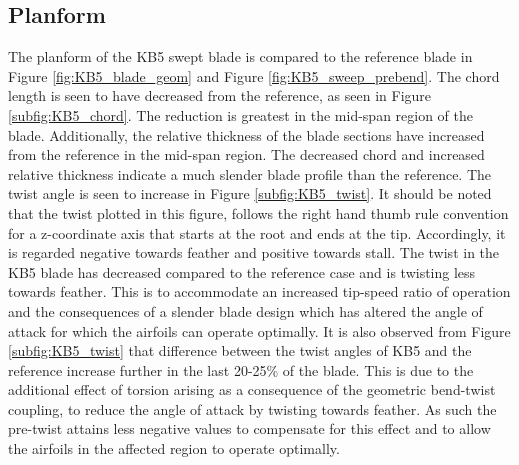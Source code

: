 
\subsection{Planform}
The planform of the KB5 swept blade is compared to the reference blade in Figure \ref{fig:KB5_blade_geom} and Figure \ref{fig:KB5_sweep_prebend}. The chord length is seen to have decreased from the reference, as seen in Figure \ref{subfig:KB5_chord}. The reduction is greatest in the mid-span region of the blade. Additionally, the relative thickness of the blade sections have increased from the reference in the mid-span region. The decreased chord and increased relative thickness indicate a much slender blade profile than the reference. The twist angle is seen to increase in Figure \ref{subfig:KB5_twist}. It should be noted that the twist plotted in this figure, follows the right hand thumb rule convention for a z-coordinate axis that starts at the root and ends at the tip. Accordingly, it is regarded negative towards feather and positive towards stall. The twist in the KB5 blade has decreased compared to the reference case and is twisting less towards feather. This is to accommodate an increased tip-speed ratio of operation and the consequences of a slender blade design which has altered the angle of attack for which the airfoils can operate optimally. It is also observed from Figure \ref{subfig:KB5_twist} that difference between the twist angles of KB5 and the reference increase further in the last 20-25\% of the blade. This is due to the additional effect of torsion arising as a consequence of the geometric bend-twist coupling, to reduce the angle of attack by twisting towards feather. As such the pre-twist attains less negative values to compensate for this effect and to allow the airfoils in the affected region to operate optimally.


